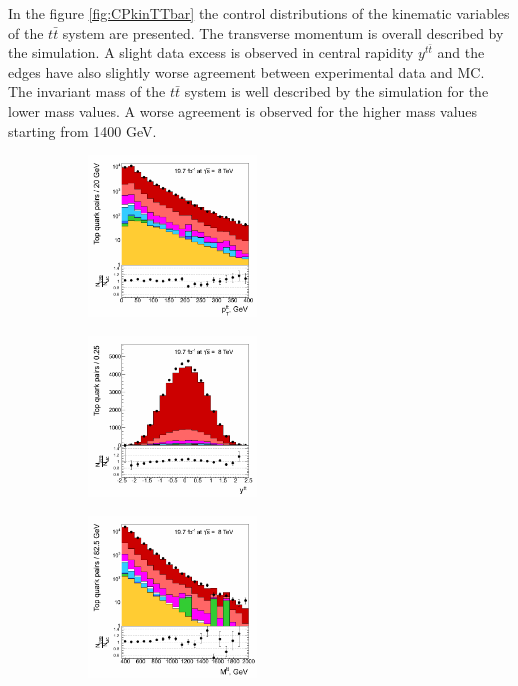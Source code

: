 In the figure \ref{fig:CPkinTTbar} the control distributions of the kinematic variables of the $t\bar{t}$ system are presented. The transverse momentum is overall
described by the simulation. A slight data excess is observed in central rapidity $y^{t\bar{t}}$ and the edges have also slightly worse agreement between
experimental data and MC. The invariant mass of the $t\bar{t}$ system is well described by the simulation for the lower mass values. A worse agreement is
observed for the higher mass values starting from 1400 GeV.

\begin{figure}[h]
\centering
\begin{subfigure}
  \centering
  \includegraphics[width=0.49\textwidth]{05_kinReco/plots/CP_ttbar_pt.png}
\end{subfigure}
\begin{subfigure}
  \centering
  \includegraphics[width=0.49\textwidth]{05_kinReco/plots/CP_ttbar_rapidity.png}
\end{subfigure}
\begin{subfigure}
  \centering
  \includegraphics[width=0.49\textwidth]{05_kinReco/plots/CP_ttbar_mass.png}

\end{subfigure}
\end{figure}
